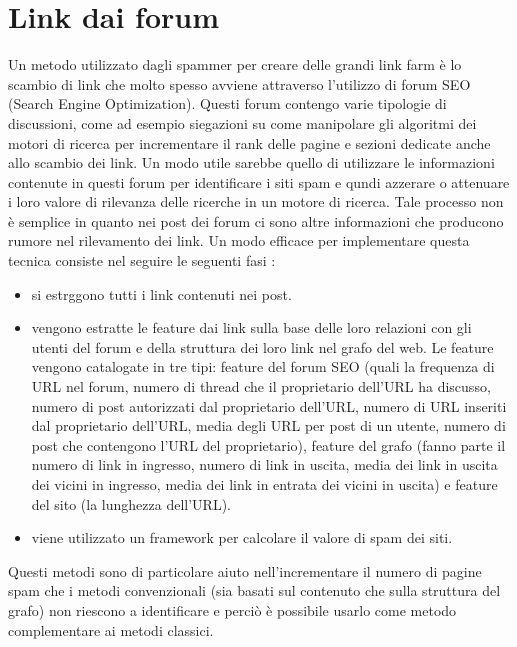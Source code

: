 \section{Link dai forum}
Un metodo utilizzato dagli spammer per creare delle grandi link farm è lo scambio di link che molto spesso avviene attraverso l'utilizzo di forum SEO (Search Engine Optimization). Questi forum contengo varie tipologie di discussioni, come ad esempio siegazioni su come manipolare gli algoritmi dei motori di ricerca per incrementare il rank delle pagine e sezioni dedicate anche allo scambio dei link. Un modo utile sarebbe quello di utilizzare le informazioni contenute in questi forum per identificare i siti spam e qundi azzerare o attenuare i loro valore di rilevanza delle ricerche in un motore di ricerca. Tale processo non è semplice in quanto nei post dei forum ci sono altre informazioni che producono rumore nel rilevamento dei link. Un modo efficace per implementare questa tecnica consiste nel seguire le seguenti fasi \cite{Cheng:2011:LWS:1935826.1935902}: 
\begin{itemize}
 \item si estrggono tutti i link contenuti nei post.
 \item vengono estratte le feature dai link sulla base delle loro relazioni con gli utenti del forum e della struttura dei loro link nel grafo del web. Le feature vengono catalogate in tre tipi: feature del forum SEO (quali la frequenza di URL nel forum, numero di thread che il proprietario dell'URL ha discusso, numero di post autorizzati dal proprietario dell'URL, numero di URL inseriti dal proprietario dell'URL, media degli URL per post di un utente, numero di post che contengono l'URL del proprietario), feature del grafo (fanno parte il numero di link in ingresso, numero di link in uscita, media dei link in uscita dei vicini in ingresso, media dei link in entrata dei vicini in uscita) e feature del sito (la lunghezza dell'URL). 
 \item viene utilizzato un framework per calcolare il valore di spam dei siti.
\end{itemize}
Questi metodi sono di particolare aiuto nell'incrementare il numero di pagine spam che i metodi convenzionali (sia basati sul contenuto che sulla struttura del grafo) non riescono a identificare  e perciò è possibile usarlo come metodo complementare ai metodi classici. 


